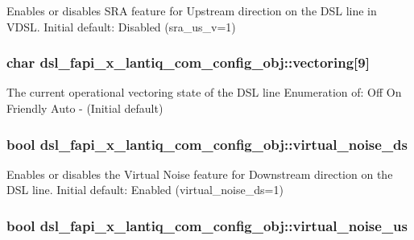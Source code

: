 Enables or disables S\-R\-A feature for Upstream direction on the D\-S\-L line in V\-D\-S\-L. Initial default\-: Disabled (sra\-\_\-us\-\_\-v=1) \hypertarget{structdsl__fapi__x__lantiq__com__config__obj_ad30678405cb97ee59e237cd1862361f8}{
\subsubsection[{vectoring}]{\setlength{\rightskip}{0pt plus 5cm}char dsl\-\_\-fapi\-\_\-x\-\_\-lantiq\-\_\-com\-\_\-config\-\_\-obj\-::vectoring\mbox{[}9\mbox{]}}}\label{structdsl__fapi__x__lantiq__com__config__obj_ad30678405cb97ee59e237cd1862361f8}
The current operational vectoring state of the D\-S\-L line Enumeration of\-: Off On Friendly Auto -\/ (Initial default) \hypertarget{structdsl__fapi__x__lantiq__com__config__obj_a4233ed6f0010e7e17785824f885cec21}{
\subsubsection[{virtual\-\_\-noise\-\_\-ds}]{\setlength{\rightskip}{0pt plus 5cm}bool dsl\-\_\-fapi\-\_\-x\-\_\-lantiq\-\_\-com\-\_\-config\-\_\-obj\-::virtual\-\_\-noise\-\_\-ds}}\label{structdsl__fapi__x__lantiq__com__config__obj_a4233ed6f0010e7e17785824f885cec21}
Enables or disables the Virtual Noise feature for Downstream direction on the D\-S\-L line. Initial default\-: Enabled (virtual\-\_\-noise\-\_\-ds=1) \hypertarget{structdsl__fapi__x__lantiq__com__config__obj_aa49239a1b460ec28b61b740f0915b9ae}{
\subsubsection[{virtual\-\_\-noise\-\_\-us}]{\setlength{\rightskip}{0pt plus 5cm}bool dsl\-\_\-fapi\-\_\-x\-\_\-lantiq\-\_\-com\-\_\-config\-\_\-obj\-::virtual\-\_\-noise\-\_\-us}}\label{structdsl__fapi__x__lantiq__com__config__obj_aa49239a1b460ec28b61b740f0915b9ae}

